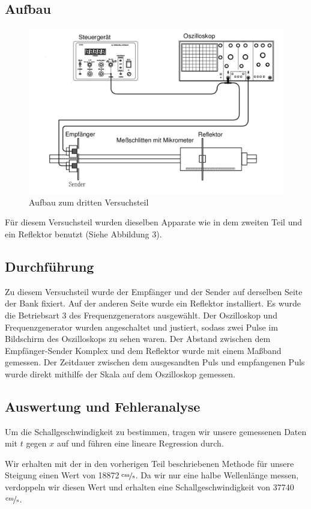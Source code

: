 \documentclass[11pt,a4paper]{article}
\begin{document}
\subsection{Aufbau}
\begin{figure}[h]
	\centering
	\includegraphics[scale=0.5]{Abb3}
	\caption{Aufbau zum dritten Versuchsteil}
\end{figure}
Für diesem Versuchsteil wurden dieselben Apparate wie in dem zweiten Teil und ein Reflektor benutzt (Siehe Abbildung 3). 

\subsection{Durchführung}
Zu diesem Versuchsteil wurde der Empfänger und der Sender auf derselben Seite der Bank fixiert. Auf der anderen Seite wurde ein Reflektor installiert. Es wurde die Betriebsart 3 des Frequenzgenerators ausgewählt. Der Oszilloskop und Frequenzgenerator wurden angeschaltet und justiert, sodass zwei Pulse im Bildschirm des Oszilloskops zu sehen waren. Der Abstand zwischen dem Empfänger-Sender Komplex und dem Reflektor wurde mit einem Maßband gemessen. Der Zeitdauer zwischen dem ausgesandten Puls und empfangenen Puls wurde direkt mithilfe der Skala auf dem Oszilloskop gemessen. 

\subsection{Auswertung und Fehleranalyse}

Um die Schallgeschwindigkeit zu bestimmen, tragen wir unsere gemessenen Daten mit $t$ gegen $x$ auf und f\"uhren eine lineare Regression durch. 

Wir erhalten mit der in den vorherigen Teil beschriebenen Methode f\"ur unsere Steigung einen Wert von 18872\,$\nicefrac{\mathrm{cm}}{\mathrm{s}}$. Da wir nur eine halbe Wellenl\"ange messen, verdoppeln wir diesen Wert und erhalten eine Schallgeschwindigkeit von 37740\,$\nicefrac{\mathrm{cm}}{\mathrm{s}}$.
\end{document}
